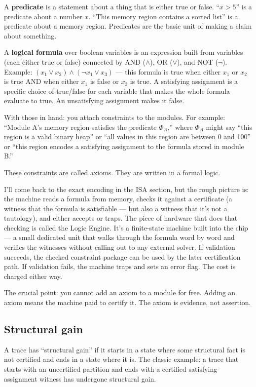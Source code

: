 \documentclass[11pt,a4paper]{article}
\theoremstyle{plain}
\theoremstyle{definition}
\theoremstyle{remark}
\begin{document}
A \textbf{predicate} is a statement about a thing that is either true or false. ``$x > 5$'' is a predicate about a number $x$. ``This memory region contains a sorted list'' is a predicate about a memory region. Predicates are the basic unit of making a claim about something.

A \textbf{logical formula} over boolean variables is an expression built from variables (each either true or false) connected by AND ($\land$), OR ($\lor$), and NOT ($\neg$). Example: $(x_1 \lor x_2) \land (\neg x_1 \lor x_3)$ — this formula is true when either $x_1$ or $x_2$ is true AND when either $x_1$ is false or $x_3$ is true. A satisfying assignment is a specific choice of true/false for each variable that makes the whole formula evaluate to true. An unsatisfying assignment makes it false.

With those in hand: you attach constraints to the modules. For example: ``Module A's memory region satisfies the predicate $\Phi_A$,'' where $\Phi_A$ might say ``this region is a valid binary heap'' or ``all values in this region are between 0 and 100'' or ``this region encodes a satisfying assignment to the formula stored in module B.''

These constraints are called axioms. They are written in a formal logic.

I'll come back to the exact encoding in the ISA section, but the rough picture is: the machine reads a formula from memory, checks it against a certificate (a witness that the formula is satisfiable — but also a witness that it's not a tautology), and either accepts or traps. The piece of hardware that does that checking is called the Logic Engine. It's a finite-state machine built into the chip — a small dedicated unit that walks through the formula word by word and verifies the witnesses without calling out to any external solver. If validation succeeds, the checked constraint package can be used by the later certification path. If validation fails, the machine traps and sets an error flag. The cost is charged either way.

The crucial point: you cannot add an axiom to a module for free. Adding an axiom means the machine paid to certify it. The axiom is evidence, not assertion.

\subsection{Structural gain}

A trace has ``structural gain'' if it starts in a state where some structural fact is not certified and ends in a state where it is. The classic example: a trace that starts with an uncertified partition and ends with a certified satisfying-assignment witness has undergone structural gain.
\end{document}
